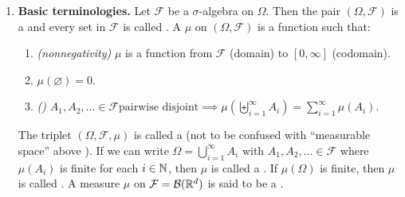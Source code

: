 \begin{enumerate}
\item\label{it:meas-basic-terms} \textbf{Basic terminologies.}
Let \(\mathcal{F}\) be a \(\sigma\)-algebra on \(\Omega\). Then the pair
\((\Omega,\mathcal{F})\) is a  and every set in \(\mathcal{F}\) is called .
A  \(\mu\) on \((\Omega,\mathcal{F})\) is a function such that:
\begin{enumerate}[label={(\arabic*)}]
\item \emph{(nonnegativity)} \(\mu\) is a function from \(\mathcal{F}\) (domain) to \([0,\infty]\) (codomain).
\item \(\mu(\varnothing)=0\).
\item \emph{()} \(A_1,A_2,\dotsc\in\mathcal{F}\text{
pairwise disjoint} \implies
\mu(\biguplus_{i=1}^{\infty}A_i)=\sum_{i=1}^{\infty}\mu(A_i)\).
\end{enumerate}

The triplet \((\Omega,\mathcal{F},\mu)\) is called a  (not
to be confused with ``measurable space'' above \warn{}).  If we can write
\(\Omega=\bigcup_{i=1}^{\infty}A_i\) with \(A_1,A_2,\dotsc\in\mathcal{F}\)
where \(\mu(A_i)\) is finite for each \(i\in\mathbb{N}\), then \(\mu\) is called a
. If \(\mu(\Omega)\) is finite, then \(\mu\) is called
. A measure \(\mu\) on \(\mathcal{F}=\mathcal{B}(\mathbb{R}^d)\) is said
to be a .


\end{enumerate}
